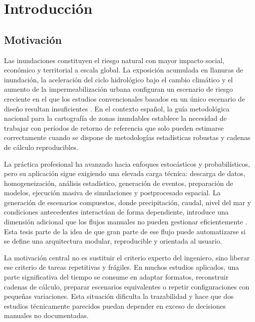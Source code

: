 \chapter{Introducción}
\label{ch:introduccion}

\section{Motivación}

Las inundaciones constituyen el riesgo natural con mayor impacto social, económico y territorial a escala global. La exposición acumulada en llanuras de inundación, la aceleración del ciclo hidrológico bajo el cambio climático y el aumento de la impermeabilización urbana configuran un escenario de riesgo creciente en el que los estudios convencionales basados en un único escenario de diseño resultan insuficientes \parencite{najibi2018global,hirabayashi2013climate}. En el contexto español, la guía metodológica nacional para la cartografía de zonas inundables \parencite{marm2011guia} establece la necesidad de trabajar con períodos de retorno de referencia que solo pueden estimarse correctamente cuando se dispone de metodologías estadísticas robustas y cadenas de cálculo reproducibles.

La práctica profesional ha avanzado hacia enfoques estocásticos y probabilísticos, pero su aplicación sigue exigiendo una elevada carga técnica: descarga de datos, homogeneización, análisis estadístico, generación de eventos, preparación de modelos, ejecución masiva de simulaciones y postprocesado espacial. La generación de escenarios compuestos, donde precipitación, caudal, nivel del mar y condiciones antecedentes interactúan de forma dependiente, introduce una dimensión adicional que los flujos manuales no pueden gestionar eficientemente \parencite{zscheischler2020compound}. Esta tesis parte de la idea de que gran parte de ese flujo puede automatizarse si se define una arquitectura modular, reproducible y orientada al usuario.

La motivación central no es sustituir el criterio experto del ingeniero, sino liberar ese criterio de tareas repetitivas y frágiles. En muchos estudios aplicados, una parte significativa del tiempo se consume en adaptar formatos, reconstruir cadenas de cálculo, preparar escenarios equivalentes o repetir configuraciones con pequeñas variaciones. Esta situación dificulta la trazabilidad y hace que dos estudios técnicamente parecidos puedan depender en exceso de decisiones manuales no documentadas.

